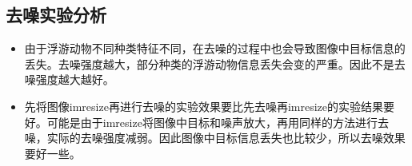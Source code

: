 \documentclass[12pt]{article}
\begin{document}
\subsection{去噪实验分析}
\begin{itemize}
\item 由于浮游动物不同种类特征不同，在去噪的过程中也会导致图像中目标信息的丢失。去噪强度越大，部分种类的浮游动物信息丢失会变的严重。因此不是去噪强度越大越好。
\item 先将图像imresize再进行去噪的实验效果要比先去噪再imresize的实验结果要好。可能是由于imresize将图像中目标和噪声放大，再用同样的方法进行去噪，实际的去噪强度减弱。因此图像中目标信息丢失也比较少，所以去噪效果要好一些。
\end{itemize}

%
%
%
%
%
%



\end{document}
